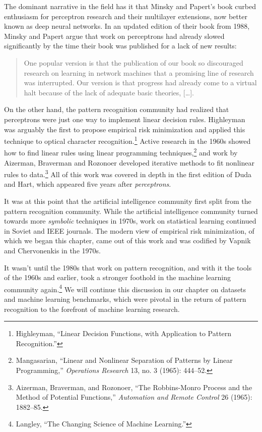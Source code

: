 \documentclass{tufte-book}
\begin{document}
The dominant narrative in the field has it that Minsky and Papert's book
curbed enthusiasm for perceptron research and their multilayer
extensions, now better known as deep neural networks. In an updated
edition of their book from 1988, Minsky and Papert argue that work on
perceptrons had already slowed significantly by the time their book was
published for a lack of new results:

\begin{quote}
One popular version is that the publication of our book so discouraged
research on learning in network machines that a promising line of
research was interrupted. Our version is that progress had already come
to a virtual halt because of the lack of adequate basic theories,
{[}\ldots{]}.
\end{quote}

On the other hand, the pattern recognition community had realized that
perceptrons were just one way to implement linear decision rules.
Highleyman was arguably the first to propose empirical risk minimization
and applied this technique to optical character recognition.\footnote{Highleyman,
  {``Linear Decision Functions, with Application to Pattern
  Recognition.''}} Active research in the 1960s showed how to find
linear rules using linear programming techniques,\footnote{Mangasarian,
  {``Linear and Nonlinear Separation of Patterns by Linear
  Programming,''} \emph{Operations Research} 13, no. 3 (1965): 444--52.}
and work by Aizerman, Braverman and Rozonoer developed iterative methods
to fit nonlinear rules to data.\footnote{Aizerman, Braverman, and
  Rozonoer, {``The Robbins-Monro Process and the Method of Potential
  Functions,''} \emph{Automation and Remote Control} 26 (1965):
  1882--85.} All of this work was covered in depth in the first edition
of Duda and Hart, which appeared five years after \emph{perceptrons}.

It was at this point that the artificial intelligence community first
split from the pattern recognition community. While the artificial
intelligence community turned towards more \emph{symbolic} techniques in
1970s, work on statistical learning continued in Soviet and IEEE
journals. The modern view of empirical risk minimization, of which we
began this chapter, came out of this work and was codified by Vapnik and
Chervonenkis in the 1970s.

It wasn't until the 1980s that work on pattern recognition, and with it
the tools of the 1960s and earlier, took a stronger foothold in the
machine learning community again.\footnote{Langley, {``The Changing
  Science of Machine Learning.''}} We will continue this discussion in
our chapter on datasets and machine learning benchmarks, which were
pivotal in the return of pattern recognition to the forefront of machine
learning research.
\end{document}
